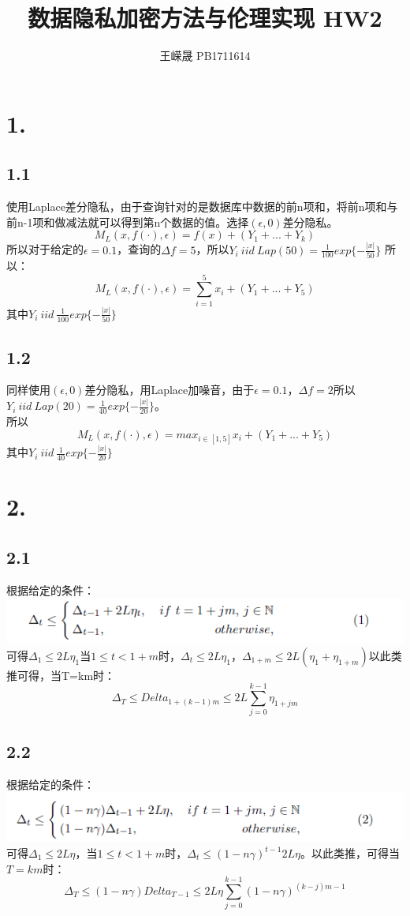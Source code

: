 \documentclass{article}
\title{数据隐私加密方法与伦理实现 HW2}
\author{王嵘晟 \quad PB1711614}
\date{}
\begin{document}
	\maketitle
	\section*{1.}
	\subsection*{1.1}
	使用Laplace差分隐私，由于查询针对的是数据库中数据的前n项和，将前n项和与前n-1项和做减法就可以得到第n个数据的值。选择$(\epsilon,0)$差分隐私。
	$$M_{L}(x,f(·),\epsilon) = f(x) + (Y_{1}+...+Y_{k})$$
	所以对于给定的$\epsilon=0.1$，查询的$\Delta f=5$，所以$Y_{i}\ iid\ Lap(50)=\frac{1}{100}exp\{-\frac{|x|}{50}\}$
	所以：
	$$M_{L}(x,f(·),\epsilon)=\sum_{i=1}^{5}x_{i} + (Y_{1}+...+Y_{5})$$
	其中$Y_{i}\ iid\ \frac{1}{100}exp\{-\frac{|x|}{50}\}$
	\subsection*{1.2}
	同样使用$(\epsilon,0)$差分隐私，用Laplace加噪音，由于$\epsilon=0.1$，$\Delta f=2$所以$Y_{i}\ iid\ Lap(20) = \frac{1}{40}exp\{-\frac{|x|}{20}\}$。\\
	所以
	$$M_{L}(x,f(·),\epsilon)=max_{i\in [1,5]}x_{i} + (Y_{1}+...+Y_{5})$$
	其中$Y_{i}\ iid\ \frac{1}{40}exp\{-\frac{|x|}{20}\}$
	\section*{2.}
	\subsection*{2.1}
	根据给定的条件：\\
	\includegraphics*[scale = 1]{1.png}\\
	可得$\Delta_{1}\le 2L\eta_{1}$当$1\le t< 1+m$时，$\Delta_{t}\le 2L\eta_{1}$，$\Delta_{1+m}\le 2L(\eta_{1}+\eta_{1+m})$以此类推可得，当T=km时：
	$$\Delta_{T}\le Delta_{1+(k-1)m}\le 2L\sum_{j=0}^{k-1}\eta_{1+jm}$$
	\subsection*{2.2}
	根据给定的条件：\\
	\includegraphics*[scale = 1]{2.png}\\
	可得$\Delta_{1}\le 2L\eta$，当$1\le t< 1+m$时，$\Delta_{t}\le (1-n\gamma)^{t-1}2L\eta$。以此类推，可得当$T=km$时：
	$$\Delta_{T}\le (1-n\gamma)Delta_{T-1}\le 2L\eta \sum_{j=0}^{k-1}(1-n\gamma)^{(k-j)m-1}$$
\end{document}
